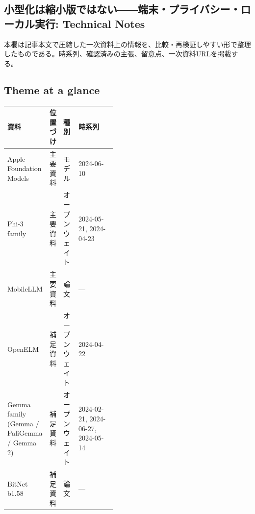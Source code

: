 \subsection*{小型化は縮小版ではない――端末・プライバシー・ローカル実行: Technical Notes}
本欄は記事本文で圧縮した一次資料上の情報を、比較・再検証しやすい形で整理したものである。時系列、確認済みの主張、留意点、一次資料URLを掲載する。
\medskip
\subsection*{Theme at a glance}
\begin{center}
\footnotesize
\begin{tabularx}{\linewidth}{@{}p{0.20\linewidth}p{0.10\linewidth}p{0.14\linewidth}X@{}}
\toprule
資料 & 位置づけ & 種別 & 時系列 \\
\midrule
Apple Foundation Models & 主要資料 & モデル & 2024-06-10   \\
Phi-3 family & 主要資料 & オープンウェイト & 2024-05-21, 2024-04-23   \\
MobileLLM & 主要資料 & 論文 & — \\
OpenELM & 補足資料 & オープンウェイト & 2024-04-22   \\
Gemma family (Gemma / PaliGemma / Gemma 2) & 補足資料 & オープンウェイト & 2024-02-21, 2024-06-27, 2024-05-14   \\
BitNet b1.58 & 補足資料 & 論文 & — \\
\bottomrule
\end{tabularx}
\end{center}
\normalsize

